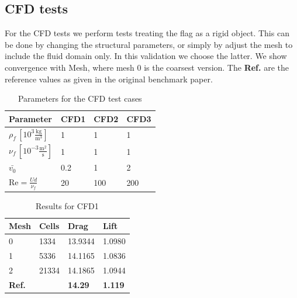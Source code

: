 \subsection{CFD tests}
For the CFD tests we perform tests treating the flag as a rigid object. This can be done by changing the structural parameters, or simply by adjust the mesh to include the fluid domain only. In this validation we choose the latter. We show convergence with Mesh, where mesh 0 is the coarsest version. The \textbf{Ref.} are the reference values as given in the original benchmark paper. 

\begin{table}[!ht]
\begin{center}
  \begin{tabular}{|l | l | l | l|} \hline
	Parameter & CFD1 & CFD2 & CFD3 \\ \hline
    $\rho_f\, [10^3\frac{\text{kg}}{\text{m}^3}]$  & 1 & 1 & 1 \\   \hline
    $\nu_f\, [10^{-3}\frac{\text{m}^2}{\text{s}}]$ & 1 & 1 & 1 \\ \hline
    $\bar{v_0}$ & 0.2 & 1 & 2   \\ \hline \hline
    $\text{Re} = \frac{Ud}{\nu_f}$ & 20 & 100 & 200 \\ \hline 
    \hline
  \end{tabular}
  \caption{Parameters for the CFD test cases}
\end{center}
\end{table}
\begin{table}[!ht]
\begin{center}
  \begin{tabular}{|l | l | l | l|} \hline
	Mesh & Cells & Drag & Lift \\ \hline
    0  & 1334 & 13.9344 & 1.0980  \\   \hline
    1 & 5336 & 14.1165 & 1.0836 \\ \hline
    2 & 21334 & 14.1865 & 1.0944  \\ \hline \hline
    \textbf{Ref.}  & & \textbf{14.29} & \textbf{1.119} \\ \hline 
    \hline
  \end{tabular}
\end{center}
\caption{Results for CFD1}
\end{table}

